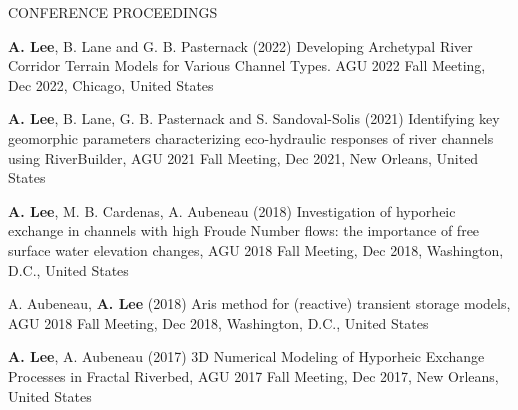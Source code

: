 \documentclass{resume_anzy} %
\begin{document}
%



\begin{rSection}{CONFERENCE PROCEEDINGS}
\vspace{-2.5mm}
\item \textbf{A. Lee}, B. Lane and G. B. Pasternack (2022) Developing Archetypal River Corridor Terrain Models for Various Channel Types. AGU 2022 Fall Meeting, Dec 2022, Chicago, United States 
\item \textbf{A. Lee}, B. Lane, G. B. Pasternack and S. Sandoval-Solis (2021) Identifying key geomorphic parameters characterizing eco-hydraulic responses of river channels using RiverBuilder, AGU 2021 Fall Meeting, Dec 2021, New Orleans, United States 
\item \textbf{A. Lee}, M. B. Cardenas, A. Aubeneau (2018) Investigation of hyporheic exchange in channels with high Froude Number flows: the importance of free surface water elevation changes, AGU 2018 Fall Meeting, Dec 2018, Washington, D.C., United States 
\item A. Aubeneau, \textbf{A. Lee}  (2018) Aris method for (reactive) transient storage models, AGU 2018 Fall Meeting, Dec 2018, Washington, D.C., United States 
\item \textbf{A. Lee}, A. Aubeneau (2017) 3D Numerical Modeling of Hyporheic Exchange Processes in Fractal Riverbed, AGU 2017 Fall Meeting, Dec 2017, New Orleans, United States 
\end{rSection}

\end{document}
